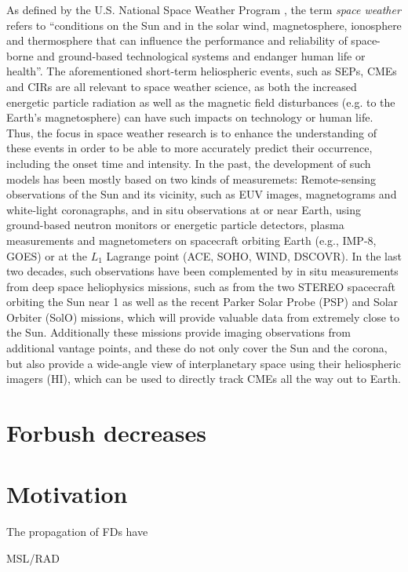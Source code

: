 As defined by the U.S. National Space Weather Program \parencite{OFCM-1995}, the term \textit{space weather} refers to ``conditions on the Sun and in the solar wind, magnetosphere, ionosphere and thermosphere that can influence the performance and reliability of space-borne and ground-based technological systems and endanger human life or health''.
The aforementioned short-term heliospheric events, such as \acp{SEP}, \acp{CME} and \acp{CIR} are all relevant to space weather science, as both the increased energetic particle radiation as well as the magnetic field disturbances (e.g. to the Earth's magnetosphere) can have such impacts on technology or human life.
Thus, the focus in space weather research is to enhance the understanding of these events in order to be able to more accurately predict their occurrence, including the onset time and intensity.
In the past, the development of such models has been mostly based on two kinds of measuremets: Remote-sensing observations of the Sun and its vicinity, such as EUV images, magnetograms and white-light coronagraphs, and in situ observations at or near Earth, using ground-based neutron monitors or energetic particle detectors, plasma measurements and magnetometers on spacecraft orbiting Earth (e.g., IMP-8, GOES) or at the $L_1$ Lagrange point (ACE, SOHO, WIND, DSCOVR).
In the last two decades, such observations have been complemented by in situ measurements from deep space heliophysics missions, such as from the two STEREO spacecraft orbiting the Sun near \SI{1}{\AU} as well as the recent Parker Solar Probe (PSP) and Solar Orbiter (SolO) missions, which will provide valuable data from extremely close to the Sun. Additionally these missions provide imaging observations from additional vantage points, and these do not only cover the Sun and the corona, but also provide a wide-angle view of interplanetary space using their heliospheric imagers (HI), which can be used to directly track \acp{CME} all the way out to Earth.

\section{Forbush decreases}



\section{Motivation}

The propagation of 
\acp{FD} have 

\ac{MSL}/\ac{RAD}